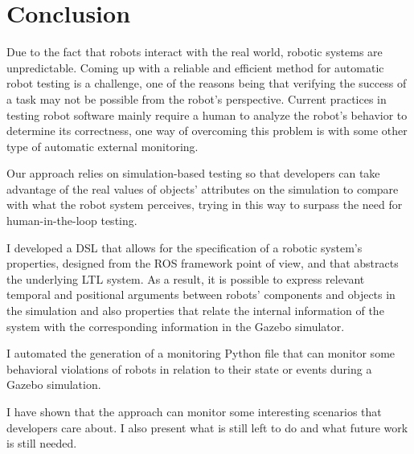 \chapter{Conclusion}
\label{chap:conclusion}


Due to the fact that robots interact with the real world, robotic systems are unpredictable. Coming up with a reliable and efficient method for automatic robot testing is a challenge, one of the reasons being that verifying the success of a task may not be possible from the robot's perspective. Current practices in testing robot software mainly require a human to analyze the robot's behavior to determine its correctness, one way of overcoming this problem is with some other type of automatic external monitoring.

Our approach relies on simulation-based testing so that developers can take advantage of the real values of objects'
attributes on the simulation to compare with what the robot system perceives, trying in this way to surpass the need for human-in-the-loop testing.

I developed a DSL that allows for the specification of a robotic system's properties, designed from the ROS framework point of view, and that abstracts the underlying LTL system. As a result, it is possible to express relevant temporal and positional arguments between robots' components and objects in the simulation and also properties that relate the internal information of the system with the corresponding information in the Gazebo simulator.

I automated the generation of a monitoring Python file that can monitor some behavioral violations of robots in relation to their state or events during a Gazebo simulation.

I have shown that the approach can monitor some interesting scenarios that developers care about. I also present what is still left to do and what future work is still needed.

